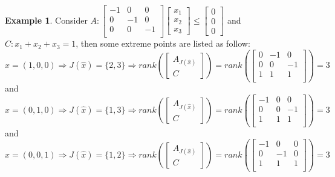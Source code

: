 \documentclass[10pt]{article}
\def\imp{\Rightarrow}
\theoremstyle{definition}
\newtheorem{example}{Example}[section]
\begin{document}
\begin{example}
	Consider $A: \begin{bmatrix}
			-1 & 0  & 0  \\
			0  & -1 & 0  \\
			0  & 0  & -1 \\
		\end{bmatrix}\begin{bmatrix}
			x_1 \\ x_2\\ x_3
		\end{bmatrix} \le \begin{bmatrix}
			0 \\ 0\\ 0
		\end{bmatrix}$ and $C: x_1 + x_2 + x_3 = 1$, then some extreme points are listed as follow:\\
	$\hat{x} = (1, 0, 0) \imp J(\hat{x}) = \{2, 3\} \imp
		rank(\begin{bmatrix} A_{J(\hat{x})} \\ C \end{bmatrix}) =
		rank(\begin{bmatrix}
			0 & -1 & 0  \\
			0 & 0  & -1 \\
			1 & 1  & 1  \\
		\end{bmatrix}) = 3$ and \\
	$\hat{x} = (0, 1, 0) \imp J(\hat{x}) = \{1, 3\} \imp
		rank(\begin{bmatrix} A_{J(\hat{x})} \\ C \end{bmatrix}) =
		rank(\begin{bmatrix}
			-1 & 0 & 0  \\
			0  & 0 & -1 \\
			1  & 1 & 1  \\
		\end{bmatrix}) = 3$ and \\
	$\hat{x} = (0, 0, 1) \imp J(\hat{x}) = \{1, 2\} \imp
		rank(\begin{bmatrix} A_{J(\hat{x})} \\ C \end{bmatrix}) =
		rank(\begin{bmatrix}
			-1 & 0  & 0 \\
			0  & -1 & 0 \\
			1  & 1  & 1 \\
		\end{bmatrix}) = 3$
\end{example}
\end{document}
